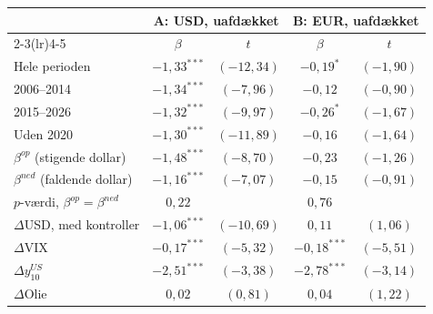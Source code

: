 \begin{tabular}{lcccc}
\toprule
 & \multicolumn{2}{c}{A: USD, uafdækket} & \multicolumn{2}{c}{B: EUR, uafdækket} \\
\cmidrule(lr){2-3}\cmidrule(lr){4-5}
 & $\beta$ & $t$ & $\beta$ & $t$ \\
\midrule
Hele perioden & $-1{,}33^{***}$ & $(-12{,}34)$ & $-0{,}19^{*}$ & $(-1{,}90)$ \\
2006--2014 & $-1{,}34^{***}$ & $(-7{,}96)$ & $-0{,}12$ & $(-0{,}90)$ \\
2015--2026 & $-1{,}32^{***}$ & $(-9{,}97)$ & $-0{,}26^{*}$ & $(-1{,}67)$ \\
Uden 2020 & $-1{,}30^{***}$ & $(-11{,}89)$ & $-0{,}16$ & $(-1{,}64)$ \\
\midrule
$\beta^{op}$ (stigende dollar) & $-1{,}48^{***}$ & $(-8{,}70)$ & $-0{,}23$ & $(-1{,}26)$ \\
$\beta^{ned}$ (faldende dollar) & $-1{,}16^{***}$ & $(-7{,}07)$ & $-0{,}15$ & $(-0{,}91)$ \\
$p$-værdi, $\beta^{op}=\beta^{ned}$ & $0{,}22$ & & $0{,}76$ & \\
\midrule
$\Delta$USD, med kontroller & $-1{,}06^{***}$ & $(-10{,}69)$ & $0{,}11$ & $(1{,}06)$ \\
$\Delta$VIX & $-0{,}17^{***}$ & $(-5{,}32)$ & $-0{,}18^{***}$ & $(-5{,}51)$ \\
$\Delta y^{US}_{10}$ & $-2{,}51^{***}$ & $(-3{,}38)$ & $-2{,}78^{***}$ & $(-3{,}14)$ \\
$\Delta$Olie & $0{,}02$ & $(0{,}81)$ & $0{,}04$ & $(1{,}22)$ \\
\bottomrule
\end{tabular}
